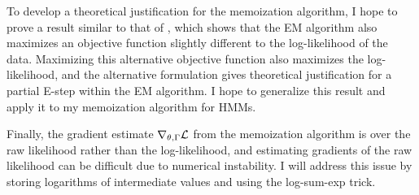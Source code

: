 To develop a theoretical justification for the memoization algorithm, I hope to prove a result similar to that of \citet{Neal:1998}, which shows that the EM algorithm also maximizes an objective function slightly different to the log-likelihood of the data. Maximizing this alternative objective function also maximizes the log-likelihood, and the alternative formulation gives theoretical justification for a partial E-step within the EM algorithm. I hope to generalize this result and apply it to my memoization algorithm for HMMs.

Finally, the gradient estimate $\nabla_{\theta,\Gamma}\mathcal{L}$ from the memoization algorithm is over the raw likelihood rather than the log-likelihood, and estimating gradients of the raw likelihood can be difficult due to numerical instability. I will address this issue by storing logarithms of intermediate values and using the log-sum-exp trick. 

